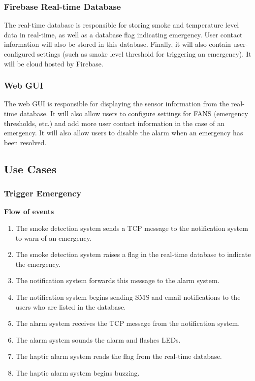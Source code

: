 \subsubsection{Firebase Real-time Database} %

The real-time database is responsible for storing smoke and temperature level data in real-time, as well as a database
flag indicating emergency. User contact information will also be stored in this database. Finally, it will also contain
user-configured settings (such as smoke level threshold for triggering an emergency). It will be cloud hosted by
Firebase.

\subsubsection{Web GUI}

The web GUI is responsible for displaying the sensor information from the real-time database. It will also allow users
to configure settings for FANS (emergency thresholds, etc.) and add more user contact information in the case of an
emergency. It will also allow users to disable the alarm when an emergency has been resolved.

\subsection{Use Cases}

\subsubsection{Trigger Emergency}

\textbf{Flow of events}
\begin{enumerate}
    \item The smoke detection system sends a TCP message to the notification system to warn of an emergency.
    \item The smoke detection system raises a flag in the real-time database to indicate the emergency.
    \item The notification system forwards this message to the alarm system.
    \item The notification system begins sending SMS and email notifications to the users who are listed in the database.
    \item The alarm system receives the TCP message from the notification system.
    \item The alarm system sounds the alarm and flashes LEDs.
    \item The haptic alarm system reads the flag from the real-time database.
    \item The haptic alarm system begins buzzing.
\end{enumerate}
